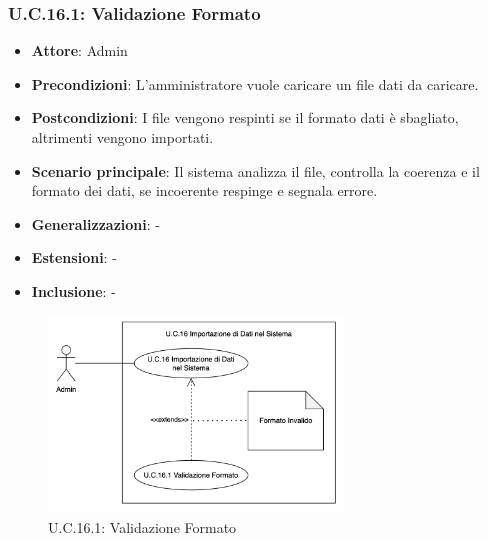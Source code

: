\subsubsection{U.C.16.1: Validazione Formato}
\begin{itemize}
    \item \textbf{Attore}: Admin
    \item \textbf{Precondizioni}: L’amministratore vuole caricare un file dati da caricare.
    \item \textbf{Postcondizioni}: I file vengono respinti se il formato dati è sbagliato, altrimenti vengono importati.
    \item \textbf{Scenario principale}: Il sistema analizza il file, controlla la coerenza e il formato dei dati, se incoerente respinge e segnala errore.
    \item \textbf{Generalizzazioni}: -
    \item \textbf{Estensioni}: -
    \item \textbf{Inclusione}: -
\end{itemize}
\begin{figure}[H]
    \centering
    \includegraphics[width=0.7\textwidth]{img/UC16.1.png}
    \caption{U.C.16.1: Validazione Formato}
\end{figure}
\newpage

